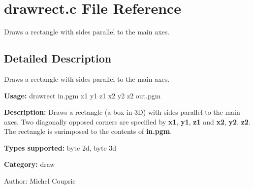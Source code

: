 \section{drawrect.c File Reference}
\label{drawrect_8c}
Draws a rectangle with sides parallel to the main axes. 



\subsection{Detailed Description}
Draws a rectangle with sides parallel to the main axes. 

{\bf Usage:} drawrect in.pgm x1 y1 z1 x2 y2 z2 out.pgm

{\bf Description:} Draws a rectangle (a box in 3D) with sides parallel to the main axes. Two diagonally opposed corners are specified by {\bf x1}, {\bf y1}, {\bf z1} and {\bf x2}, {\bf y2}, {\bf z2}. The rectangle is surimposed to the contents of {\bf in.pgm}.

{\bf Types supported:} byte 2d, byte 3d

{\bf Category:} draw

\begin{Desc}
\item[Author:]Michel Couprie \end{Desc}
